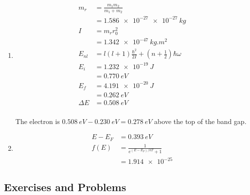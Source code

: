 \documentclass{article}
\begin{document}
\begin{enumerate}
  \item

        \begin{align*}
          m_r      & = \frac{m_1 m_2}{m_1 + m_2}                                                   \\
                   & = \qty{1.586e-27e-27}{kg}                                                     \\
          I        & = m_r r_0^2                                                                   \\
                   & = \qty{1.342e-47}{kg.m^2}                                                     \\
          E_{nl}   & = l (l + 1) \frac{\hbar^2}{2 I} + \left( n + \frac{1}{2} \right) \hbar \omega \\
          E_i      & = \qty{1.232e-19}{J}                                                          \\
                   & = \qty{0.770}{eV}                                                             \\
          E_f      & = \qty{4.191e-20}{J}                                                          \\
                   & = \qty{0.262}{eV}                                                             \\
          \Delta E & = \qty{0.508}{eV}                                                             \\
        \end{align*}

        The electron is $\qty{0.508}{eV} - \qty{0.230}{eV} = \qty{0.278}{eV}$ above the top of the band gap.

  \item

        \begin{align*}
          E - E_F & = \qty{0.393}{eV}                   \\
          f(E)    & = \frac{1}{e^{(E - E_F) / k T} + 1} \\
                  & = \num{1.914e-25}
        \end{align*}
\end{enumerate}

\subsection{Exercises and Problems}
\end{document}

